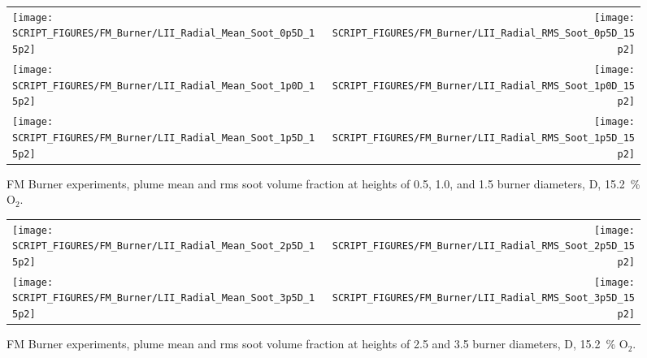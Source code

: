 \begin{figure}[!h]
\begin{tabular*}{\textwidth}{l@{\extracolsep{\fill}}r}
\texttt{[image: SCRIPT\_FIGURES/FM\_Burner/LII\_Radial\_Mean\_Soot\_0p5D\_15p2]} &
\texttt{[image: SCRIPT\_FIGURES/FM\_Burner/LII\_Radial\_RMS\_Soot\_0p5D\_15p2]} \\
\texttt{[image: SCRIPT\_FIGURES/FM\_Burner/LII\_Radial\_Mean\_Soot\_1p0D\_15p2]} &
\texttt{[image: SCRIPT\_FIGURES/FM\_Burner/LII\_Radial\_RMS\_Soot\_1p0D\_15p2]} \\
\texttt{[image: SCRIPT\_FIGURES/FM\_Burner/LII\_Radial\_Mean\_Soot\_1p5D\_15p2]} &
\texttt{[image: SCRIPT\_FIGURES/FM\_Burner/LII\_Radial\_RMS\_Soot\_1p5D\_15p2]}
\end{tabular*}
\caption[FM Burner experiments, plume mean and rms soot volume fraction, 15.2~\% O$_2$]
{FM Burner experiments, plume mean and rms soot volume fraction at heights of 0.5, 1.0, and 1.5 burner diameters, D, 15.2~\% O$_2$.}
\label{FM_Burner_Soot_5}
\end{figure}

\begin{figure}[p]
\begin{tabular*}{\textwidth}{l@{\extracolsep{\fill}}r}
\texttt{[image: SCRIPT\_FIGURES/FM\_Burner/LII\_Radial\_Mean\_Soot\_2p5D\_15p2]} &
\texttt{[image: SCRIPT\_FIGURES/FM\_Burner/LII\_Radial\_RMS\_Soot\_2p5D\_15p2]} \\
\texttt{[image: SCRIPT\_FIGURES/FM\_Burner/LII\_Radial\_Mean\_Soot\_3p5D\_15p2]} &
\texttt{[image: SCRIPT\_FIGURES/FM\_Burner/LII\_Radial\_RMS\_Soot\_3p5D\_15p2]}
\end{tabular*}
\caption[FM Burner experiments, plume mean and rms soot voiume fraction, 15.2~\% O$_2$]
{FM Burner experiments, plume mean and rms soot volume fraction at heights of 2.5 and 3.5 burner diameters, D, 15.2~\% O$_2$.}
\label{FM_Burner_Soot_6}
\end{figure}



